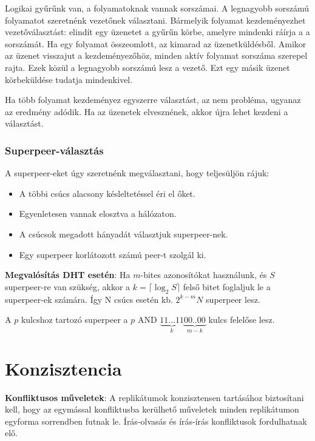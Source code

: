 \documentclass[margin=0px]{article}
\begin{document}
	Logikai gyűrűnk van, a folyamatoknak vannak sorszámai. A legnagyobb sorszámú folyamatot szeretnénk vezetőnek választani.
	Bármelyik folyamat kezdeményezhet vezetőválasztást: elindít egy üzenetet a gyűrűn körbe, amelyre mindenki ráírja a
	a sorszámát. Ha egy folyamat összeomlott, az kimarad az üzenetküldésből. Amikor az üzenet visszajut a kezdeményezőhöz,
	minden aktív folyamat sorszáma szerepel rajta. Ezek közül a legnagyobb sorszámú lesz a vezető. Ezt egy másik
	üzenet körbeküldése tudatja mindenkivel.
	
	Ha több folyamat kezdeményez egyszerre választást, az nem probléma, ugyanaz az eredmény adódik. Ha az üzenetek
	elvesznének, akkor újra lehet kezdeni a választást.
	
	\subsubsection{Superpeer-választás}
	
	A superpeer-eket úgy szeretnénk megválasztani, hogy teljesüljön rájuk:
	
	\begin{itemize}
		\item	A többi csúcs alacsony késleltetéssel éri el őket.
		\item	Egyenletesen vannak elosztva a hálózaton.
		\item	A csúcsok megadott hányadát választjuk superpeer-nek.
		\item	Egy superpeer korlátozott számú peer-t szolgál ki.
	\end{itemize}
	
	\noindent \textbf{Megvalósítás DHT esetén}: Ha $m$-bites azonosítókat használunk, és $S$ superpeer-re van szükség, akkor
	a $k= \lceil \log_{2} S \rceil$ felső bitet foglaljuk le a superpeer-ek számára. Így N csúcs esetén kb. $2^{k-m}N$
	superpeer lesz. 
	
	A $p$ kulcshoz tartozó superpeer a $p$ AND $\underbrace{11...11}_{k}\underbrace{00..00}_{m-k}$ kulcs felelőse lesz.
	
	\section{Konzisztencia}
	
	\noindent \textbf{Konfliktusos műveletek}: A replikátumok konzisztensen tartásához biztosítani kell, hogy az egymással
	konfliktusba kerülhető műveletek minden replikátumon egyforma sorrendben futnak le. Írás-olvasás és írás-írás
	konfliktusok fordulhatnak elő.\\
	
\end{document}
